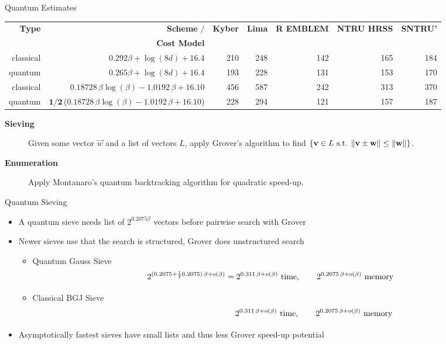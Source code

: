 \documentclass[xcolor=table,10pt,aspectratio=169]{beamer}
\def\enumlinfit{\(0.18728\, \beta \log(\beta) - 1.0192\,\beta + 16.10\)}
\def\robl{\rowcolor{DarkBlue!20}}
\def\rore{\rowcolor{DarkRed!20}}
\begin{document}
\begin{frame}[label={sec:orgb4a90e8}]{Quantum Estimates}
\begin{scriptsize}
\begin{center}
\begin{tabular}{rrrrrrr}
\textbf{Type} & \textbf{Scheme}      / & \textbf{Kyber} & \textbf{Lima} & \textbf{R EMBLEM} & \textbf{NTRU HRSS} & \textbf{SNTRU’}\\
 & \textbf{Cost Model} &  &  &  &  & \\
\hline
\rore classical & \(\mathbf{0.292}\beta + \log(8d) + 16.4\) & 210 & 248 & 142 & 165 & 184\\
\rore quantum & \(\mathbf{0.265}\beta + \log(8d) + 16.4\) & 193 & 228 & 131 & 153 & 170\\
\robl classical & \enumlinfit{} & 456 & 587 & 242 & 313 & 370\\
\robl  quantum & \(\mathbf{1/2}\,\)(\enumlinfit{}) & 228 & 294 & 121 & 157 & 187\\
\end{tabular}

\end{center}
\end{scriptsize}

\begin{description}
\item[{{\color{LightRed} \textbf{Sieving} }}] Given some vector \(\vec{w}\) and a list of vectors \(L\), apply Grover’s algorithm to find \(\{\vec{v} \in L \textnormal{ s.t. } \|\vec{v} \pm \vec{w}\| \leq \|\vec{w}\|\}\).

\item[{{\color{DarkBlue} \textbf{Enumeration} }}] Apply Montanaro’s quantum backtracking algorithm for quadratic speed-up.
\end{description}
\end{frame}

\begin{frame}[label={sec:org84ce3a8}]{Quantum Sieving}
\begin{itemize}
\item A quantum sieve needs list of \(2^{0.2075 \beta}\) vectors before pairwise search with Grover

\item Newer sieves use that the search is structured, Grover does unstructured search
\begin{itemize}
\item Quantum Gauss Sieve \[2^{(0.2075 + \frac{1}{2} 0.2075)\, \beta + o(\beta)} = 2^{0.311\, \beta + o(\beta)} \textnormal{ time},\qquad 2^{0.2075\, \beta + o(\beta)} \textnormal{ memory}\]
\item Classical BGJ Sieve  \[\phantom{2^{(0.2075 + \frac{1}{2} 0.2075)\, \beta + o(\beta)} = }2^{0.311\, \beta + o(\beta)}\textnormal{ time}, \qquad 2^{0.2075\, \beta + o(\beta)} \textnormal{ memory}\]
\end{itemize}
\item Asymptotically fastest sieves have small lists and thus less Grover speed-up potential
\end{itemize}
\end{frame}
\end{document}
